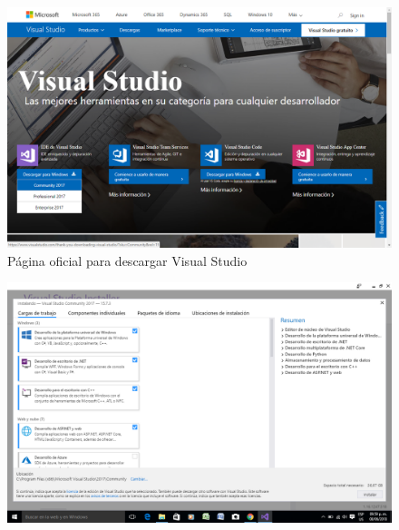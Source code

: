 \documentclass[12pt,a4paper]{report}
\begin{document}
\begin{figure}[hbtp]
\centering
\includegraphics[width=16cm]{Csh_Imagenes/Descarga1.png}
\caption{Página oficial para descargar Visual Studio}
\end{figure}
\begin{figure}[hbtp]
\centering
\includegraphics[width=16cm]{Csh_Imagenes/Instalacion.png}
\caption{}
\end{figure}
\end{document}
